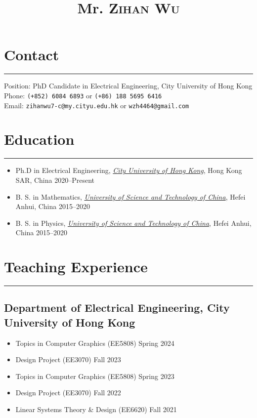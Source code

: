 \documentclass{article}
\title{Mr. \scshape Zihan Wu}
\author{}
\date{}
\newcommand{\cussection}[1]{\vspace{--0.05in}\section*{#1}\vspace{--0.1in} \hrule\vspace{0.2in} }
\begin{document}
\maketitle
\thispagestyle{empty}
\vspace{-0.5in}

\cussection{Contact}
Position: PhD Candidate in Electrical Engineering, City University of Hong Kong\\
Phone: \texttt{(+852) 6084 6893} or \texttt{(+86) 188 5695 6416} \\ %
Email: \texttt{zihanwu7-c@my.cityu.edu.hk} or \texttt{wzh4464@gmail.com}
\cussection{Education}
\begin{itemize}
    \item Ph.D in Electrical Engineering, \href{https://www.cityu.edu.hk/}{\emph{City University of Hong Kong}}, Hong Kong SAR, China \hfill 2020--Present
    \item B. S. in Mathematics, \href{https://en.ustc.edu.cn/}{\emph{University of Science and Technology of China}}, Hefei Anhui, China \hfill{2015--2020}
    \item B. S. in Physics, \href{https://en.ustc.edu.cn/}{\emph{University of Science and Technology of China}}, Hefei Anhui, China \hfill{2015--2020}
\end{itemize}




\cussection{Teaching Experience}

\subsection*{Department of Electrical Engineering, City University of Hong Kong}

\begin{itemize}
    \item Topics in Computer Graphics (EE5808) \hfill Spring 2024
    \item Design Project (EE3070) \hfill Fall 2023
    \item Topics in Computer Graphics (EE5808) \hfill Spring 2023
    \item Design Project (EE3070) \hfill Fall 2022
    \item Linear Systems Theory \& Design (EE6620) \hfill Fall 2021
\end{itemize}
\end{document}
